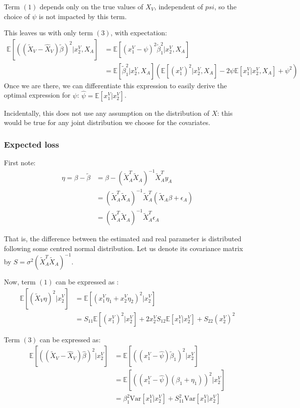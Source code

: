 \documentclass[12pt, a4paper]{memoir}
\begin{document}
Term $(1)$ depends only on the true values of $X_V$, independent of $psi$, so the choice of $\psi$  is not impacted by this term.

This leaves us with only term $(3)$, with expectation:
\begin{align*}
\mathbb{E}[((\tilde{X}_V-\hat{X}_V)\tilde{\beta})^2 \vert x^V_2, X_A] &= \mathbb{E}[(x_1^V - \psi)^2 \tilde{\beta}_1^2 \vert x^V_2, X_A] \\
													&= \mathbb{E}[\tilde{\beta}_1^2 \vert x^V_2, X_A] (\mathbb{E}[(x_1^V)^2\vert x^V_2, X_A] - 2\psi \mathbb{E}[x_1^V\vert x^V_2, X_A] + \psi^2)
\end{align*}
Once we are there, we can differentiate this expression to easily derive the optimal expression for $\psi$: $\hat{\psi} = \mathbb{E}[x_1^V\vert x^V_2]$.

Incidentally, this does not use any assumption on the distribution of $X$: this would be true for any joint distribution we choose for the covariates.

			\subsubsection{Expected loss}
First note:
\begin{align*}
\eta = \beta - \tilde{\beta} &= \beta - (\tilde{X}_A^T \tilde{X}_A)^{-1} \tilde{X}_A^T y_A \\
		&= (\tilde{X}_A^T \tilde{X}_A)^{-1} \tilde{X}_A^T (\tilde{X}_A \beta + \epsilon_A) \\
		&= (\tilde{X}_A^T \tilde{X}_A)^{-1} \tilde{X}_A^T \epsilon_A
\end{align*}

That is, the difference between the estimated and real parameter is distributed following some centred normal distribution. Let us denote its covariance matrix by $S = \sigma^2 (\tilde{X}_A^T \tilde{X}_A)^{-1} $.

Now, term $(1)$ can be expressed as :
\begin{align*}
\mathbb{E}[(\tilde{X}_V \eta)^2 \vert x^V_2] &= \mathbb{E}[(x^V_1 \eta_1 + x^V_2 \eta_2)^2\vert x^V_2] \\
											&= S_{11} \mathbb{E}[(x^V_1)^2 \vert x^V_2]  + 2x^V_2 S_{12} \mathbb{E}[x^V_1 \vert x^V_2] + S_{22} (x^V_2)^2
\end{align*}

Term $(3)$ can be expressed as:
\begin{align*}
\mathbb{E}[((\tilde{X}_V - \hat{X}_V) \hat{\beta})^2 \vert x^V_2]&= \mathbb{E}[((x^V_1 - \hat{\psi})\tilde{\beta}_1)^2 \vert x^V_2] \\
									 &= \mathbb{E}[((x^V_1 - \hat{\psi})(\beta_1 + \eta_1))^2 \vert x^V_2] \\
									&= \beta_1^2 \text{Var}[x^V_1 \vert x^V_2] + S_{11}^2 \text{Var}[x^V_1 \vert x^V_2] 
\end{align*}
\end{document}
